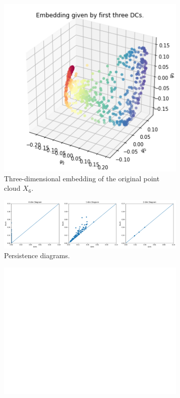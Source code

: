 \begin{figure}[H]
\centering
\begin{subfigure}[b]{0.2\textwidth}
    \includegraphics[width=\textwidth]{figures/X6_embedding.png}
    \caption{Three-dimensional embedding of the original point cloud $X_6$.}
\end{subfigure}
\hfill
\begin{subfigure}[b]{0.75\textwidth}
    \includegraphics[width=\textwidth]{figures/X6_H0.png}
    \caption{Persistence diagrams.}
\end{subfigure}
\begin{subfigure}[b]{0.25\textwidth}
\includegraphics[width=\textwidth]{figures/white.png} 

\end{subfigure}
\end{figure}
